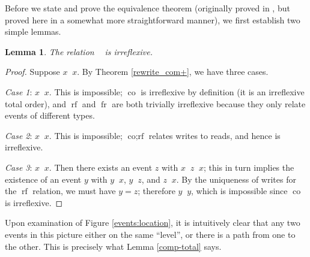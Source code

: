\documentclass[]{eptcs}
\newtheorem{lemma}[theorem]{Lemma}
\DeclareMathOperator{\co}{co}
\DeclareMathOperator{\rf}{rf}
\DeclareMathOperator{\fr}{fr}
\DeclareMathOperator{\corf}{co;rf}
\DeclareMathOperator{\comp}{com^+}
\DeclareMathOperator{\coto}{\xrightarrow{co}}
\DeclareMathOperator{\rfto}{\xrightarrow{rf}}
\DeclareMathOperator{\frto}{\xrightarrow{fr}}
\DeclareMathOperator{\frrfto}{\xrightarrow{fr;rf}}
\DeclareMathOperator{\corfto}{\xrightarrow{co;rf}}
\DeclareMathOperator{\comto}{\xrightarrow{com}}
\DeclareMathOperator{\compto}{\xrightarrow{com^+}}
\begin{document}
Before we state and prove the equivalence theorem (originally proved in \cite{alglave_thesis}, but proved here in a somewhat more straightforward manner), we first establish two simple lemmas.
\begin{lemma}\label{com-acyclic}
The relation $\comp$ is irreflexive.
\end{lemma}
\begin{proof}
Suppose $x \compto x$. By Theorem \ref{rewrite_com+}, we have three cases.

\emph{Case 1}: $x \comto x$. This is impossible; $\co$ is irreflexive by definition (it is an irreflexive total order), and $\rf$ and $\fr$ are both trivially irreflexive because they only relate events of different types.

\emph{Case 2}: $x \corfto x$. This is impossible; $\corf$ relates writes to reads, and hence is irreflexive.

\emph{Case 3}: $x \frrfto x$. Then there exists an event $z$ with $x \frto z \rfto x$; this in turn implies the existence of an event $y$ with $y \rfto x$, $y \coto z$, and $z \rfto x$. By the uniqueness of writes for the $\rf$ relation, we must have $y = z$; therefore $y \coto y$, which is impossible since $\co$ is irreflexive.
\end{proof}

Upon examination of Figure \ref{events:location}, it is intuitively clear that any two events in this picture either on the same ``level'', or there is a path from one to the other. This is precisely what Lemma \ref{comp-total} says.
\end{document}
